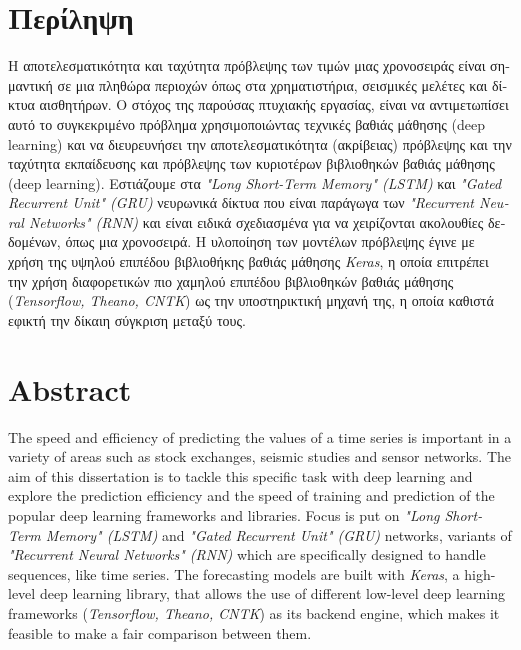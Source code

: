 \documentclass[a4paper, 12pt]{article}
\numberwithin{equation}{section}
\numberwithin{figure}{section}
\numberwithin{table}{section}
\begin{document}
	
	\section*{\textgreek{Περίληψη}}
	
	\begin{otherlanguage}{greek}
		Η αποτελεσματικότητα και ταχύτητα πρόβλεψης των τιμών μιας χρονοσειράς είναι σημαντική σε μια πληθώρα περιοχών όπως στα χρηματιστήρια, σεισμικές μελέτες και δίκτυα αισθητήρων. Ο στόχος της	παρούσας πτυχιακής εργασίας, είναι να αντιμετωπίσει αυτό το συγκεκριμένο πρόβλημα χρησιμοποιώντας τεχνικές βαθιάς μάθησης (\textlatin{deep learning)} και να διευρευνήσει την αποτελεσματικότητα (ακρίβειας) πρόβλεψης και την ταχύτητα	εκπαίδευσης και πρόβλεψης των κυριοτέρων βιβλιοθηκών βαθιάς μάθησης (\textlatin{deep learning)}. Εστιάζουμε στα \textlatin{\textit{ "Long Short-Term Memory" (LSTM)}} και \textlatin{\textit{"Gated Recurrent Unit" (GRU)}} νευρωνικά δίκτυα που είναι παράγωγα των \textlatin{\textit{"Recurrent  Neural Networks" (RNN)}} και είναι ειδικά σχεδιασμένα για να χειρίζονται ακολουθίες δεδομένων, όπως μια χρονοσειρά. Η υλοποίηση των μοντέλων πρόβλεψης έγινε με χρήση της υψηλού επιπέδου βιβλιοθήκης βαθιάς μάθησης \textit{\textlatin{Keras}},
		η οποία επιτρέπει την χρήση διαφορετικών πιο χαμηλού επιπέδου βιβλιοθηκών βαθιάς μάθησης (\textit{\textlatin{Tensorflow, Theano, CNTK}}) ως την υποστηρικτική μηχανή της, η οποία καθιστά εφικτή την δίκαιη σύγκριση μεταξύ τους.
	\end{otherlanguage}
	
	\newpage
	
	\section*{Abstract}
	
	The speed and efficiency of predicting the values of a time series is important in a variety of areas such as stock exchanges, seismic studies and sensor networks. The aim of this dissertation is to tackle this specific task with deep learning and explore the prediction efficiency and the speed of training and prediction of the popular deep learning frameworks and libraries. Focus is put on\textit{ "Long Short-Term Memory" (LSTM)}  and \textit{"Gated Recurrent Unit" (GRU)} networks, variants of \textit{"Recurrent  Neural Networks" (RNN)} which are specifically designed to handle sequences, like time series.
	The forecasting models are built with \textit{Keras}, a high-level deep learning library, that allows the use of different low-level deep learning frameworks (\textit{Tensorflow, Theano, CNTK}) as its backend engine, which makes it feasible to make a fair comparison between them.
	
\end{document}

